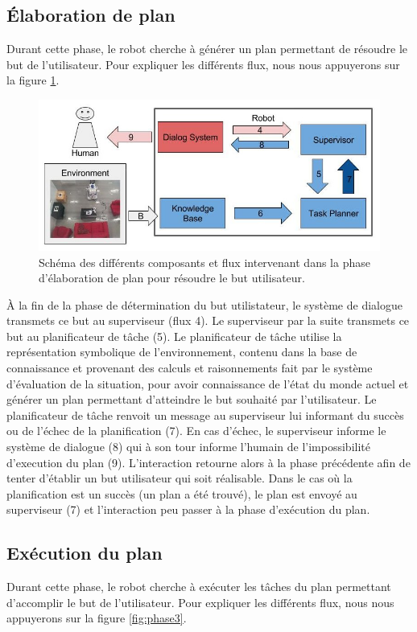 \documentclass[a4paper,11pt,twoside]{StyleThese}
\begin{document}
\subsection{Élaboration de plan}
\label{sec:phase2}
Durant cette phase, le robot cherche à générer un plan permettant de résoudre le but de l'utilisateur. Pour expliquer les différents flux, nous nous appuyerons sur la figure \ref{fig:phase2}.

\begin{figure}[ht!]
 \centering
  \includegraphics[width=0.99\linewidth]{./img/phase2color.jpg} 
  \caption {Schéma des différents composants et flux intervenant dans la phase d'élaboration de plan pour résoudre le but utilisateur.}
  \label{fig:phase2}
\end{figure}

À la fin de la phase de détermination du but utilistateur, le système de dialogue transmets ce but au superviseur (flux 4). Le superviseur par la suite transmets ce but au planificateur de tâche (5). Le planificateur de tâche utilise la représentation symbolique de l'environnement, contenu dans la base de connaissance et provenant des calculs et raisonnements fait par le système d'évaluation de la situation, pour avoir connaissance de l'état du monde actuel et générer un plan permettant d'atteindre le but souhaité par l'utilisateur. Le planificateur de tâche renvoit un message au superviseur lui informant du succès ou de l'échec de la planification (7). En cas d'échec, le superviseur informe le système de dialogue (8) qui à son tour informe l'humain de l'impossibilité d'execution du plan (9).
L'interaction retourne alors à la phase précédente afin de tenter d'établir un but utilisateur qui soit réalisable. 
Dans le cas où la planification est un succès (un plan a été trouvé), le plan est envoyé au superviseur (7) et l'interaction peu passer à la phase d'exécution du plan.


\subsection{Exécution du plan}
\label{sec:phase3}
Durant cette phase, le robot cherche à exécuter les tâches du plan permettant d'accomplir le but de l'utilisateur. Pour expliquer les différents flux, nous nous appuyerons sur la figure \ref{fig:phase3}.
\end{document}
